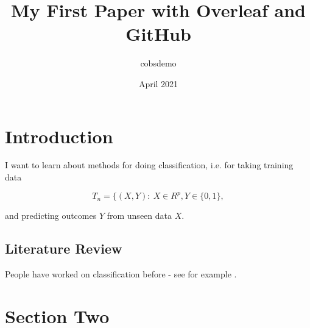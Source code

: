 \documentclass{article}
\title{My First Paper with Overleaf and GitHub}
\author{cobsdemo }
\date{April 2021}
\begin{document}
\maketitle

\section{Introduction}
I want to learn about methods for doing classification, i.e. for taking training data 

\[ T_n = \{ (X,Y): \ X \in R^p, Y \in \{0,1\}, \]

and predicting outcomes $Y$ from unseen data $X$.

\subsection{Literature Review} 
People have worked on classification before - see for example \cite{cannings_random-projection_2017}.

\section{Section Two}



\end{document}
